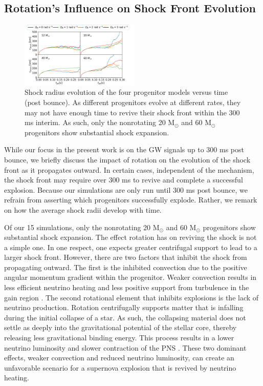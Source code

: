 \documentclass[twocolumn,times]{aastex62}  %
\newcommand{\Msun}{\ensuremath{\mathrm{M}_\odot}\xspace}
\begin{document}
\subsection{Rotation's Influence on Shock Front Evolution}

\begin{figure}[t]
    \centering
    \includegraphics[width = 0.5\textwidth]{M1_shock_mass_raster.pdf}
    \caption{Shock radius evolution of the four progenitor models versus time (post bounce).  As different progenitors evolve at different rates, they may not have enough time to revive their shock front within the 300 ms interim.  As such, only the nonrotating 20 \Msun and 60 \Msun progenitors show substantial shock expansion. }
    \label{fig:shock}
\end{figure} 

While our focus in the present work is on the GW signals up to 300 ms post bounce, we briefly discuss the impact of rotation on the evolution of the shock front as it propagates outward.  In certain cases, independent of the mechanism, the shock front may require over 300 ms to revive and complete a successful explosion.  Because our simulations are only run until 300 ms post bounce, we refrain from asserting which progenitors successfully explode.  Rather, we remark on how the average shock radii develop with time.

Of our 15 simulations, only the nonrotating 20 \Msun and 60 \Msun progenitors show substantial shock expansion.  The effect rotation has on reviving the shock is not a simple one. 
In one respect, one expects greater centrifugal support to lead to a larger shock front.  However, there are two factors that inhibit the shock from propagating outward.  The first is the inhibited convection due to the positive angular momentum gradient within the progenitor. Weaker convection results in less efficient neutrino heating \citep{dolence:2013, murphy:2013} and less positive support from turbulence in the gain region \citep{couch:2015a, mabanta:2018}.  The  second rotational element that inhibits explosions is the lack of neutrino production.  Rotation centrifugally supports matter that is infalling during the initial collapse of a star.  As such, the collapsing material does not settle as deeply into the gravitational potential of the stellar core, thereby releasing less gravitational binding energy.  This process results in a lower neutrino luminosity and slower contraction of the PNS \citep{summa:2018}. 
These two dominant effects, weaker convection and reduced neutrino luminosity, can create an unfavorable scenario for a supernova explosion that is revived by neutrino heating.
\end{document}
